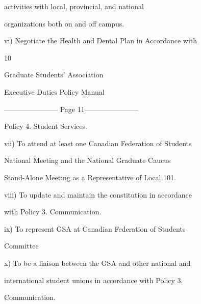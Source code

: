                   activities        with       local,      provincial,         and       national  

                  organizations both on and off campus.   

         vi)      Negotiate the Health and Dental Plan in Accordance with  



                                                 10  

                                      

                                    Graduate Students’ Association  

                                   Executive Duties Policy Manual  

  


----------------------- Page 11-----------------------

           Policy 4. Student Services.   

vii)       To  attend  at  least  one  Canadian  Federation  of  Students  

           National  Meeting  and  the  National  Graduate  Caucus  

           Stand-Alone Meeting as a Representative of Local 101.   

viii)      To  update  and  maintain  the  constitution  in  accordance  

           with Policy 3. Communication.   

ix)        To  represent  GSA  at  Canadian  Federation  of  Students  

           Committee  

x)         To be a liaison between the GSA and other national and  

           international student unions in accordance with Policy 3.  

           Communication.   

  

  

  

  

  

  

  

  

  

  

  

  

  

  

